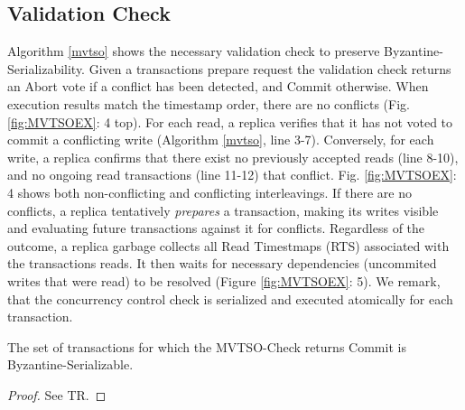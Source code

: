 
\subsection{Validation Check}

Algorithm \ref{mvtso} shows the necessary validation check to preserve Byzantine-Serializability. 
Given a transactions prepare request the validation check returns an Abort vote if a conflict has been detected, and Commit otherwise. 
When execution results match the timestamp order, there are no conflicts (Fig. \ref{fig:MVTSOEX}: 4 top). For each read, a replica verifies that it has not voted to commit a conflicting write (Algorithm \ref{mvtso}, line 3-7). Conversely, for each write, a replica confirms that there exist no previously accepted reads (line 8-10), and no ongoing read transactions (line 11-12) that conflict. Fig. \ref{fig:MVTSOEX}: 4 shows both non-conflicting and conflicting interleavings.
If there are no conflicts, a replica tentatively \textit{prepares} a transaction, making its writes visible and evaluating future transactions against it for conflicts. Regardless of the outcome, a replica garbage collects all Read Timestmaps (RTS) associated with the transactions reads.
It then waits for necessary dependencies (uncommited writes that were read) to be resolved (Figure \ref{fig:MVTSOEX}: 5). We remark, that the concurrency control check is serialized and executed atomically for each transaction.

\begin{theorem}
The set of transactions for which the MVTSO-Check returns Commit is Byzantine-Serializable. 
\end{theorem}
\begin{proof}
See TR.
\end{proof}

